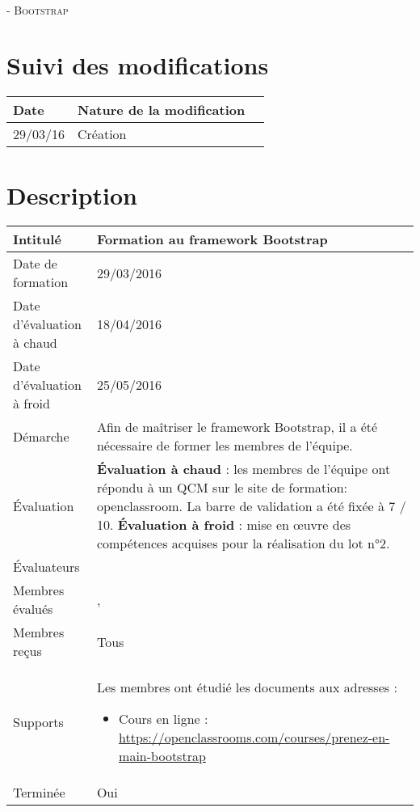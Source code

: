\documentclass[asi, sansVersion]{picInsa}
\begin{document}
	\begin{center}
		\LARGE
		\textsc{
			\FF{}\\
			 - Bootstrap
		}
	\end{center}
	\vspace{0.5cm}

	\section*{Suivi des modifications}
		\begin{table}[H]
			\centering
			\begin{tabularx}{18cm}{|p{1.7cm}|X|p{4cm}|}
				\hline
				\rowcolor[gray]{0.90} Date & Nature de la modification \\
				\hline
				
				29/03/16 & Création \\
				\hline
			\end{tabularx}
		\end{table}

	\section*{Description}
		\begin{longtable}{|p{}|p{}|}
			\hline
			\cellcolor{gris2} Intitulé & Formation au framework Bootstrap\\\hline
			\cellcolor{gris2} Date de formation & 29/03/2016\\\hline
			\cellcolor{gris2} Date d'évaluation à chaud & 18/04/2016 \\\hline
			\cellcolor{gris2} Date d'évaluation à froid & 25/05/2016\\\hline
			\cellcolor{gris2} Démarche & Afin de maîtriser le framework Bootstrap, il a été nécessaire de former les membres de l'équipe.\\\hline
			\cellcolor{gris2} Évaluation &
				\textbf{Évaluation à chaud} : les membres de l'équipe ont répondu à un QCM sur le site de formation: openclassroom. La barre de validation a été fixée à 7 / 10.\newline
				\textbf{Évaluation à froid} : mise en œuvre des compétences acquises pour la réalisation du lot n°2.\\\hline
			\cellcolor{gris2} Évaluateurs & \Matthieu{}\\\hline
			\cellcolor{gris2} Membres évalués & \Mathieu{}, \Julie{}\\\hline
			\cellcolor{gris2} Membres reçus & Tous \\\hline
			\cellcolor{gris2} Supports & Les membres ont étudié les documents aux adresses : \begin{itemize}
			\item Cours en ligne : \url{https://openclassrooms.com/courses/prenez-en-main-bootstrap}
		\end{itemize}
			 \\\hline
			\cellcolor{gris2} Terminée & Oui \\\hline
		\end{longtable}
\end{document}
